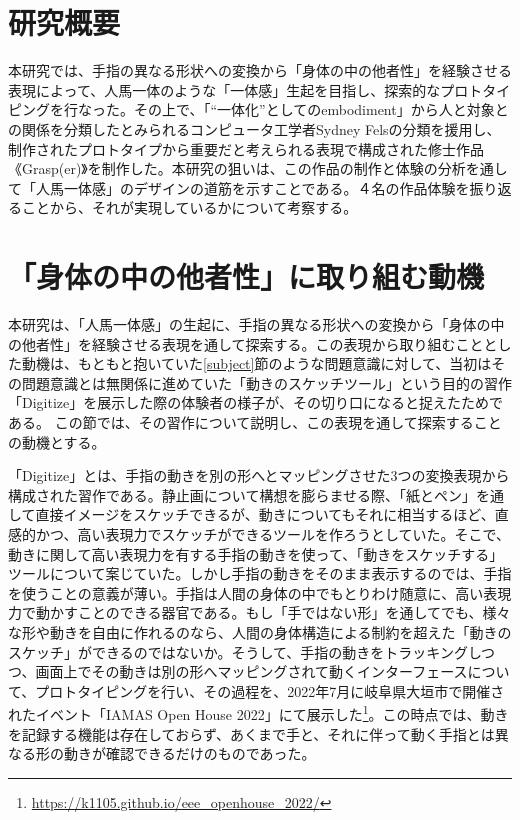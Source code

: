 
\section{研究概要}
本研究では、手指の異なる形状への変換から「身体の中の他者性」を経験させる表現によって、人馬一体のような「一体感」生起を目指し、探索的なプロトタイピングを行なった。その上で、「``一体化''としてのembodiment」から人と対象との関係を分類したとみられるコンピュータ工学者Sydney Felsの分類を援用し、制作されたプロトタイプから重要だと考えられる表現で構成された修士作品《Grasp(er)》を制作した。本研究の狙いは、この作品の制作と体験の分析を通して「人馬一体感」のデザインの道筋を示すことである。４名の作品体験を振り返ることから、それが実現しているかについて考察する。

\section{「身体の中の他者性」に取り組む動機}
\label{prototyping_concept_making}
本研究は、「人馬一体感」の生起に、手指の異なる形状への変換から「身体の中の他者性」を経験させる表現を通して探索する。この表現から取り組むこととした動機は、もともと抱いていた\ref{subject}節のような問題意識に対して、当初はその問題意識とは無関係に進めていた「動きのスケッチツール」という目的の習作「Digitize」を展示した際の体験者の様子が、その切り口になると捉えたためである。
この節では、その習作について説明し、この表現を通して探索することの動機とする。

「Digitize」とは、手指の動きを別の形へとマッピングさせた3つの変換表現から構成された習作である。静止画について構想を膨らませる際、「紙とペン」を通して直接イメージをスケッチできるが、動きについてもそれに相当するほど、直感的かつ、高い表現力でスケッチができるツールを作ろうとしていた。そこで、動きに関して高い表現力を有する手指の動きを使って、「動きをスケッチする」ツールについて案じていた。しかし手指の動きをそのまま表示するのでは、手指を使うことの意義が薄い。手指は人間の身体の中でもとりわけ随意に、高い表現力で動かすことのできる器官である。もし「手ではない形」を通してでも、様々な形や動きを自由に作れるのなら、人間の身体構造による制約を超えた「動きのスケッチ」ができるのではないか。そうして、手指の動きをトラッキングしつつ、画面上でその動きは別の形へマッピングされて動くインターフェースについて、プロトタイピングを行い、その過程を、2022年7月に岐阜県大垣市で開催されたイベント「IAMAS Open House 2022」にて展示した\footnote{\url{https://k1105.github.io/eee_openhouse_2022/}}。この時点では、動きを記録する機能は存在しておらず、あくまで手と、それに伴って動く手指とは異なる形の動きが確認できるだけのものであった。

